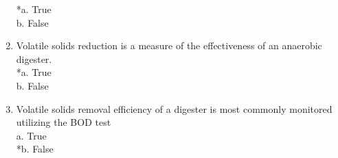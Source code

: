 \documentclass{article}
\begin{document}
\begin{enumerate}
*a. True \\
b. False \\

\item  Volatile solids reduction is a measure of the effectiveness of an anaerobic digester. \\

*a. True \\
b. False \\

\item  Volatile solids removal efficiency of a digester is most commonly monitored utilizing the BOD test \\

a. True \\
*b. False \\








\end{enumerate}
\end{document}
